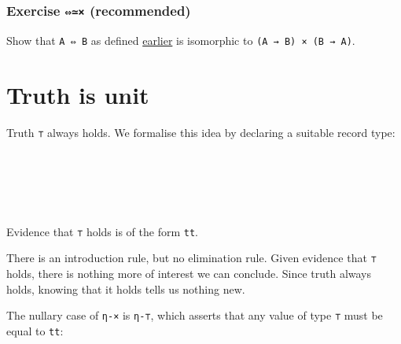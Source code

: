 \hypertarget{exercise-recommended}{%
\subsubsection{\texorpdfstring{Exercise \texttt{⇔≃×}
(recommended)}{Exercise ⇔≃× (recommended)}}\label{exercise-recommended}}

Show that \texttt{A\ ⇔\ B} as defined
\protect\hyperlink{Isomorphism-iff}{earlier} is isomorphic to
\texttt{(A\ →\ B)\ ×\ (B\ →\ A)}.

\begin{fence}
\begin{code}%
\>[0]\<%
\end{code}
\end{fence}

\hypertarget{truth-is-unit}{%
\section{Truth is unit}\label{truth-is-unit}}

Truth \texttt{⊤} always holds. We formalise this idea by declaring a
suitable record type:

\begin{fence}
\begin{code}%
\>[0]\AgdaSpace{}%
\AgdaSpace{}%
\AgdaSymbol{:}\AgdaSpace{}%
\AgdaSpace{}%
\<%
\\
%
\\[\AgdaEmptyExtraSkip]%
\>[0][@{}l@{\AgdaIndent{0}}]%
\>[2]\AgdaSpace{}%
\AgdaSymbol{:}\<%
\\
\>[2][@{}l@{\AgdaIndent{0}}]%
\>[4]\AgdaComment{--}\<%
\\
%
\>[4]\<%
\end{code}
\end{fence}

Evidence that \texttt{⊤} holds is of the form \texttt{tt}.

There is an introduction rule, but no elimination rule. Given evidence
that \texttt{⊤} holds, there is nothing more of interest we can
conclude. Since truth always holds, knowing that it holds tells us
nothing new.

The nullary case of \texttt{η-×} is \texttt{η-⊤}, which asserts that any
value of type \texttt{⊤} must be equal to \texttt{tt}:

\begin{fence}
\begin{code}%
\>[0]\AgdaSpace{}%
\AgdaSymbol{:}\AgdaSpace{}%
\AgdaSpace{}%
\AgdaSymbol{(}\AgdaSpace{}%
\AgdaSymbol{:}\AgdaSpace{}%
\AgdaSymbol{)}\AgdaSpace{}%
\AgdaSpace{}%
\AgdaSpace{}%
\AgdaSpace{}%
\<%
\\
\>[0]\AgdaSpace{}%
\AgdaSpace{}%
\AgdaSymbol{=}\AgdaSpace{}%
\<%
\end{code}
\end{fence}

